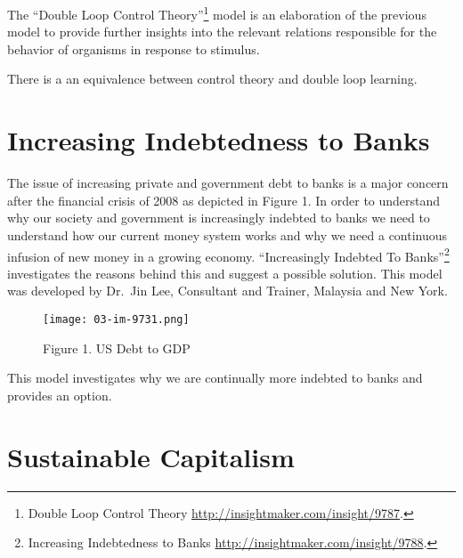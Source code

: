 \documentclass[]{memoir}
\let\Oldincludegraphics\includegraphics
\renewcommand{\includegraphics}[1]{\Oldincludegraphics[max size={\textwidth}{\textheight}]{#1}}
\begin{document}
The ``Double Loop Control Theory''\footnote{Double Loop Control Theory
  \url{http://insightmaker.com/insight/9787}.} model is an elaboration
of the previous model to provide further insights into the relevant
relations responsible for the behavior of organisms in response to
stimulus.

\FloatBarrier 

\begin{model}[frametitle={Model: Double Loop Control Theory}] 

 There is a an equivalence between control theory and double loop learning.




 \end{model}

\section{Increasing Indebtedness to Banks}

The issue of increasing private and government debt to banks is a major
concern after the financial crisis of 2008 as depicted in Figure 1. In
order to understand why our society and government is increasingly
indebted to banks we need to understand how our current money system
works and why we need a continuous infusion of new money in a growing
economy. ``Increasingly Indebted To Banks''\footnote{Increasing
  Indebtedness to Banks \url{http://insightmaker.com/insight/9788}.}
investigates the reasons behind this and suggest a possible solution.
This model was developed by Dr.~Jin Lee, Consultant and Trainer,
Malaysia and New York.

\begin{figure}[htbp]
\centering
\texttt{[image: 03-im-9731.png]}
\caption{Figure 1. US Debt to GDP}
\end{figure}

\FloatBarrier 

\begin{model}[frametitle={Model: Increasing Indebtedness to Banks}] 

 This model investigates why we are continually more indebted to banks and provides an option.




 \end{model}

\section{Sustainable Capitalism}
\end{document}
